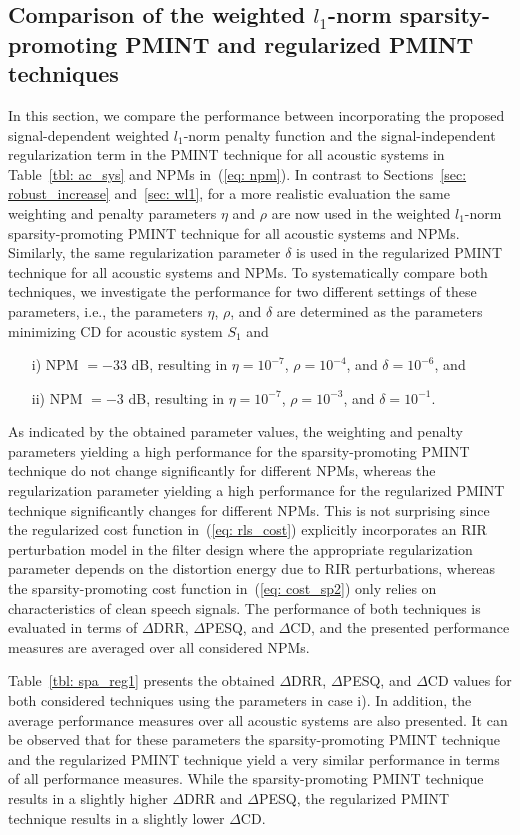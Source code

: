 \documentclass[10pt]{IEEEtran}
\begin{document}
\subsection{Comparison of the weighted $l_1$-norm sparsity-promoting PMINT and regularized PMINT techniques}
\label{sec: reg_spa}
In this section, we compare the performance between incorporating the proposed signal-dependent weighted $l_1$-norm penalty function and the signal-independent regularization term in the PMINT technique for all acoustic systems in Table~\ref{tbl: ac_sys} and NPMs in~(\ref{eq: npm}).
In contrast to Sections~\ref{sec: robust_increase} and~\ref{sec: wl1}, for a more realistic evaluation the same weighting and penalty parameters $\eta$ and $\rho$ are now used in the weighted $l_1$-norm sparsity-promoting PMINT technique for all acoustic systems and NPMs.
Similarly, the same regularization parameter $\delta$ is used in the regularized PMINT technique for all acoustic systems and NPMs.
To systematically compare both techniques, we investigate the performance for two different settings of these parameters, i.e., the parameters $\eta$, $\rho$, and $\delta$ are determined as the parameters minimizing CD for acoustic system $S_1$ and
\begin{itemize}
\item[i)] NPM $ = -33$ dB, resulting in $\eta = 10^{-7}$, $\rho = 10^{-4}$, and $\delta = 10^{-6}$, and
\item[ii)] NPM $ = -3$ dB, resulting in $\eta = 10^{-7}$, $\rho = 10^{-3}$, and $\delta = 10^{-1}$.
\end{itemize}
As indicated by the obtained parameter values, the weighting and penalty parameters yielding a high performance for the sparsity-promoting PMINT technique do not change significantly for different NPMs, whereas the regularization parameter yielding a high performance for the regularized PMINT technique significantly changes for different NPMs.
This is not surprising since the regularized cost function in~(\ref{eq: rls_cost}) explicitly incorporates an RIR perturbation model in the filter design where the appropriate regularization parameter depends on the distortion energy due to RIR perturbations, whereas the sparsity-promoting cost function in~(\ref{eq: cost_sp2}) only relies on characteristics of clean speech signals.
The performance of both techniques is evaluated in terms of $\Delta$DRR, $\Delta$PESQ, and $\Delta$CD, and the presented performance measures are averaged over all considered NPMs. 

Table~\ref{tbl: spa_reg1} presents the obtained $\Delta$DRR, $\Delta$PESQ, and $\Delta$CD values for both considered techniques using the parameters in case i).
In addition, the average performance measures over all acoustic systems are also presented.
It can be observed that for these parameters the sparsity-promoting PMINT technique and the regularized PMINT technique yield a very similar performance in terms of all performance measures.
While the sparsity-promoting PMINT technique results in a slightly higher $\Delta$DRR and $\Delta$PESQ, the regularized PMINT technique results in a slightly lower $\Delta$CD.
\end{document}
